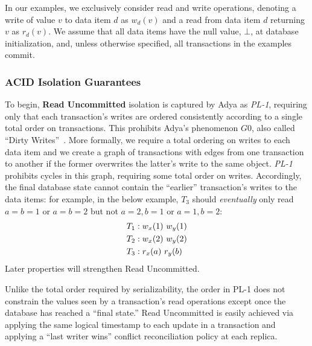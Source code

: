In our examples, we exclusively consider read and write operations,
denoting a write of value $v$ to data item $d$ as $w_d(v)$ and a read
from data item $d$ returning $v$ as $r_d(v)$. We assume that all data
items have the null value, $\bot$, at database initialization, and,
unless otherwise specified, all transactions in the examples commit.

\subsubsection{ACID Isolation Guarantees}

To begin, \textbf{Read Uncommitted} isolation is captured by Adya as
\textit{PL-1}, requiring only that each transaction's writes are ordered
consistently according to a single total order on transactions. This
prohibits Adya's phenomenon $G0$, also called ``Dirty
Writes''~\cite{adya}. More formally, we require a total ordering on
writes to each data item and we create a graph of transactions with
edges from one transaction to another if the former overwrites the
latter's write to the same object. \textit{PL-1} prohibits cycles in
this graph, requiring some total order on writes. Accordingly, the
final database state cannot contain the ``earlier'' transaction's
writes to the data items: for example, in the below example, $T_3$
should \emph{eventually} only read $a=b=1$ or $a=b=2$ but not $a=2,
b=1$ or $a=1, b=2$:
\begin{align*}
\small\vspace{-.5em}
T_1 &: w_x(1)~w_y(1)
\\T_2 &: w_x(2)~w_y(2)
\\T_3 &: r_x(a)~r_y(b)\vspace{-.5em}
\end{align*}
Later properties will strengthen Read Uncommitted.

Unlike the total order required by serializability, the order in PL-1
does not constrain the values seen by a transaction's read
operations except once the database has reached a ``final
state.'' Read Uncommitted is easily achieved via applying the same
logical timestamp to each update in a transaction and applying a
``last writer wins'' conflict reconciliation policy at each replica.

